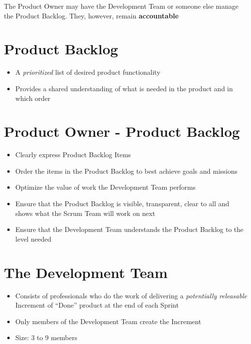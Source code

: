 \documentclass[a4paper,11pt,twocolumn]{article}
\begin{document}
\begin{tcolorbox}[colback=black!8!white,colframe=gray!50!black,title=Note,sharp corners,fonttitle=\normalsize\bfseries,fontupper=\normalsize,left=0.7em,right=0.7em]
	The Product Owner may have the Development Team or someone else manage the Product Backlog. They, however, remain \textbf{accountable}
\end{tcolorbox}

\section*{Product Backlog}
\begin{itemize}
	\item A \textit{prioritized} list of desired product functionality
	\item Provides a shared understanding of what is needed in the product and in which order
\end{itemize}

\section*{Product Owner - Product Backlog}
\begin{itemize}
    \item Clearly express Product Backlog Items
    \item Order the items in the Product Backlog to best achieve goals and missions
    \item Optimize the value of work the Development Team performs
    \item Ensure that the Product Backlog is visible, transparent, clear to all and shows what the Scrum Team will work on next
    \item Ensure that the Development Team understands the Product Backlog to the level needed
\end{itemize}

\section*{The Development Team}
\begin{itemize}
	\item Consists of professionals who do the work of delivering a \textit{potentially releasable} Increment of ``Done'' product at the end of each Sprint
	\item Only members of the Development Team create the Increment
    \item Size: 3 to 9 members
\end{itemize}
\end{document}
